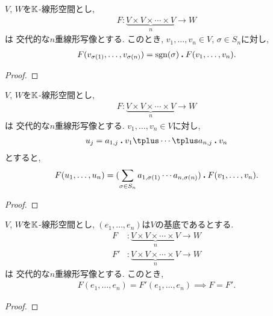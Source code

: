 \begin{prop}
  $V$, $W$を$\mathbb{K}$-線形空間とし,
  \begin{align*}
    F\colon \underbrace{V\times V\times \cdots \times V}_n\to W
  \end{align*}
  は
  交代的な$n$重線形写像とする.
  このとき, $v_1,\ldots,v_n\in V$, $\sigma\in S_n$に対し,
  \begin{align*}
    F(v_{\sigma(1)},\ldots,v_{\sigma(n)})
    =
    \operatorname{sgn}(\sigma)\mathbin{\boldsymbol{.}} F(v_1,\ldots,v_n).
  \end{align*}
\end{prop}
\begin{proof}\end{proof}

\begin{prop}
  $V$, $W$を$\mathbb{K}$-線形空間とし,
  \begin{align*}
    F\colon \underbrace{V\times V\times \cdots \times V}_n\to W
  \end{align*}
  は
  交代的な$n$重線形写像とする.
  $v_1,\ldots,v_n\in V$に対し,
  \begin{align*}
    u_j= a_{1,j}\act v_1\plus \cdots \plus a_{n,j}\act v_n
  \end{align*}
  とすると,
  \begin{align*}
    F(u_{1},\ldots,u_{n})
    =
    (\sum_{\sigma\in S_n} a_{1,\sigma(1)}\cdots a_{n,\sigma(n)})
    \mathbin{\boldsymbol{.}} F(v_1,\ldots,v_n).
  \end{align*}
\end{prop}
\begin{proof}\end{proof}

\begin{prop}
  $V$, $W$を$\mathbb{K}$-線形空間とし,
  $(e_1,\ldots,e_n)$は$V$の基底であるとする.
  \begin{align*}
    F&\colon \underbrace{V\times V\times \cdots \times V}_n\to W\\
    F'&\colon \underbrace{V\times V\times \cdots \times V}_n\to W
  \end{align*}
  は
  交代的な$n$重線形写像とする.
  このとき,
  \begin{align*}
    F(e_1,\ldots,e_n)=F'(e_1,\ldots,e_n)
    \implies
    F=F'.
  \end{align*}
\end{prop}
\begin{proof}\end{proof}


